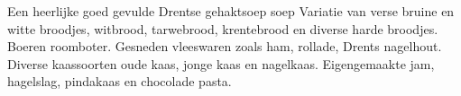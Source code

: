 Een heerlijke goed gevulde Drentse gehaktsoep soep
Variatie van verse bruine en witte broodjes, witbrood, tarwebrood, krentebrood en diverse harde broodjes.
Boeren roomboter.
Gesneden vleeswaren zoals ham, rollade, Drents nagelhout.
Diverse kaassoorten oude kaas, jonge kaas en nagelkaas.
Eigengemaakte jam, hagelslag, pindakaas en chocolade pasta.
